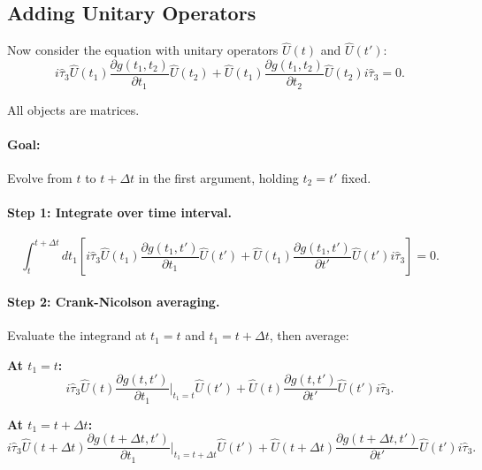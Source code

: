 \documentclass[11pt]{article}
\begin{document}
\subsection*{Adding Unitary Operators}

Now consider the equation with unitary operators $\hat{U}(t)$ and $\hat{U}(t')$:
\begin{equation}
i\hat{\tau}_3 \hat{U}(t_1) \frac{\partial g(t_1, t_2)}{\partial t_1} \hat{U}(t_2) + \hat{U}(t_1) \frac{\partial g(t_1, t_2)}{\partial t_2} \hat{U}(t_2) i\hat{\tau}_3 = 0.
\end{equation}

All objects are matrices.

\paragraph{Goal:} Evolve from $t$ to $t+\Delta t$ in the first argument, holding $t_2 = t'$ fixed.

\paragraph{Step 1: Integrate over time interval.}

\begin{equation}
\int_t^{t+\Delta t} dt_1 \left[i\hat{\tau}_3 \hat{U}(t_1) \frac{\partial g(t_1, t')}{\partial t_1} \hat{U}(t') + \hat{U}(t_1) \frac{\partial g(t_1, t')}{\partial t'} \hat{U}(t') i\hat{\tau}_3\right] = 0.
\end{equation}

\paragraph{Step 2: Crank-Nicolson averaging.}

Evaluate the integrand at $t_1 = t$ and $t_1 = t+\Delta t$, then average:

\textbf{At $t_1 = t$:}
\begin{equation}
i\hat{\tau}_3 \hat{U}(t) \frac{\partial g(t, t')}{\partial t_1}\bigg|_{t_1=t} \hat{U}(t') + \hat{U}(t) \frac{\partial g(t, t')}{\partial t'} \hat{U}(t') i\hat{\tau}_3.
\end{equation}

\textbf{At $t_1 = t+\Delta t$:}
\begin{equation}
i\hat{\tau}_3 \hat{U}(t+\Delta t) \frac{\partial g(t+\Delta t, t')}{\partial t_1}\bigg|_{t_1=t+\Delta t} \hat{U}(t') + \hat{U}(t+\Delta t) \frac{\partial g(t+\Delta t, t')}{\partial t'} \hat{U}(t') i\hat{\tau}_3.
\end{equation}
\end{document}
